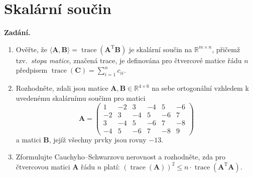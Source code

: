 \section{Skalární součin}

\noindent\textbf{Zadání.}\par
\begin{enumerate}
  \item Ověřte, že $\langle \mathbf{A}, \mathbf{B} \rangle = \operatorname{trace}(\mathbf{A}^{\mathrm{T}} \mathbf{B})$ je skalární součin na $\mathbb{R}^{m \times n}$, přičemž tzv.\ \textit{stopa matice}, značená trace, je definována pro čtvercové matice řádu $n$ předpisem $\operatorname{trace}(\mathbf{C}) = \sum_{i=1}^{n} c_{ii}$.
  \item Rozhodněte, zdali jsou matice $\mathbf{A}, \mathbf{B} \in \mathbb{R}^{4 \times 6}$ na sebe ortogonální vzhledem k uvedenému skalárnímu součinu pro matici
    \[
      \mathbf{A} = \begin{pmatrix}
        1 & -2 & 3 & -4 & 5 & -6 \\
        -2 & 3 & -4 & 5 & -6 & 7 \\
        3 & -4 & 5 & -6 & 7 & -8 \\
        -4 & 5 & -6 & 7 & -8 & 9
      \end{pmatrix}
    \]
    a matici $\mathbf{B}$, jejíž všechny prvky jsou rovny $-13$.
  \item Zformulujte Cauchyho--Schwarzovu nerovnost a rozhodněte, zda pro čtvercovou matici $\mathbf{A}$ řádu $n$ platí: $(\operatorname{trace}(\mathbf{A}))^2 \le n \cdot \operatorname{trace}(\mathbf{A}^{\mathrm{T}} \mathbf{A})$.
\end{enumerate}

